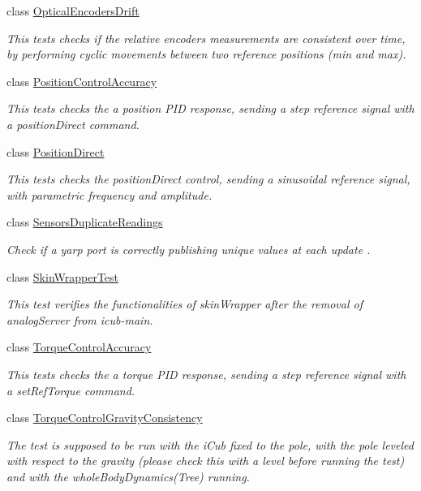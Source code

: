 \begin{DoxyCompactItemize}
class \hyperlink{classOpticalEncodersDrift}{Optical\+Encoders\+Drift}
\begin{DoxyCompactList}\small\item\em This tests checks if the relative encoders measurements are consistent over time, by performing cyclic movements between two reference positions (min and max). \end{DoxyCompactList}\item 
class \hyperlink{classPositionControlAccuracy}{Position\+Control\+Accuracy}
\begin{DoxyCompactList}\small\item\em This tests checks the a position P\+ID response, sending a step reference signal with a position\+Direct command. \end{DoxyCompactList}\item 
class \hyperlink{classPositionDirect}{Position\+Direct}
\begin{DoxyCompactList}\small\item\em This tests checks the position\+Direct control, sending a sinusoidal reference signal, with parametric frequency and amplitude. \end{DoxyCompactList}\item 
class \hyperlink{classSensorsDuplicateReadings}{Sensors\+Duplicate\+Readings}
\begin{DoxyCompactList}\small\item\em Check if a yarp port is correctly publishing unique values at each update . \end{DoxyCompactList}\item 
class \hyperlink{classSkinWrapperTest}{Skin\+Wrapper\+Test}
\begin{DoxyCompactList}\small\item\em This test verifies the functionalities of skin\+Wrapper after the removal of analog\+Server from icub-\/main. \end{DoxyCompactList}\item 
class \hyperlink{classTorqueControlAccuracy}{Torque\+Control\+Accuracy}
\begin{DoxyCompactList}\small\item\em This tests checks the a torque P\+ID response, sending a step reference signal with a set\+Ref\+Torque command. \end{DoxyCompactList}\item 
class \hyperlink{classTorqueControlGravityConsistency}{Torque\+Control\+Gravity\+Consistency}
\begin{DoxyCompactList}\small\item\em The test is supposed to be run with the i\+Cub fixed to the pole, with the pole leveled with respect to the gravity (please check this with a level before running the test) and with the whole\+Body\+Dynamics(\+Tree) running. \end{DoxyCompactList}\end{DoxyCompactItemize}


